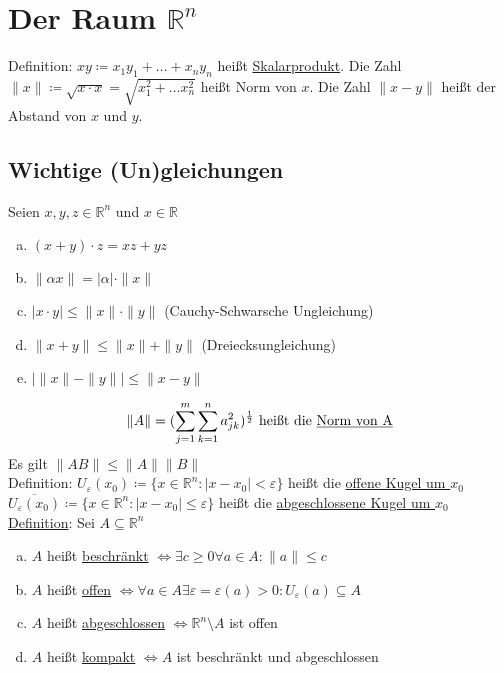 \section{Der Raum $\mathbb{R}^n$}
Definition: $xy \coloneqq x_1y_1 + \ldots + x_ny_n$ heißt \underline{Skalarprodukt}. Die Zahl $\| x \| \coloneqq \sqrt{x\cdot x} = \sqrt{x_1^2 + \ldots x_n^2}$
heißt Norm von $x$. Die Zahl $\| x-y\|$ heißt der Abstand von $x$ und $y$.

\subsection{Wichtige (Un)gleichungen}
Seien $x,y,z \in \mathbb{R}^n$ und $x \in \mathbb{R}$
\begin{enumerate} [a)]
    \item $(x+y) \cdot z = xz + yz$
    \item $\| \alpha x \| = |\alpha| \cdot \| x\|$
    \item $|x\cdot y| \leq \| x\| \cdot \| y\|$ (Cauchy-Schwarsche Ungleichung)
    \item $\|x+y\| \leq  \|x\| + \| y\|$ (Dreiecksungleichung)
    \item $|\| x \| - \| y \|| \leq \| x-y \|$
\end{enumerate}
\begin{align*}
    \|A\| = (\sum \limits_{j=1}^{m} \sum \limits_{k=1}^{n} a_{jk}^2)^{\frac{1}{2}} \text{ heißt die \underline{Norm von A}}
\end{align*}
Es gilt $\| AB\| \leq \| A \| \| B \|$ \\
Definition: $U_\varepsilon (x_0) \coloneqq \{x \in \mathbb{R}^n: |x-x_0| < \varepsilon \}$ heißt die \underline{offene Kugel um $x_0$} \\
$\overline{U_\varepsilon(x_0)} \coloneqq \{ x \in \mathbb{R}^n: |x-x_0| \leq \varepsilon\}$ heißt die \underline{abgeschlossene Kugel um $x_0$} \\

\underline{Definition}: Sei $A \subseteq \mathbb{R}^n$
\begin{enumerate} [a)]
    \item $A$ heißt \underline{beschränkt} $\Leftrightarrow \exists c \geq 0 \forall a \in A: \| a \| \leq c$
    \item $A$ heißt \underline{offen} $\Leftrightarrow \forall a \in A \exists \varepsilon = \varepsilon(a) > 0: U_\varepsilon(a) \subseteq A$ 
    \item $A$ heißt \underline{abgeschlossen} $\Leftrightarrow \mathbb{R}^n \setminus A$ ist offen
    \item $A$ heißt \underline{kompakt} $\Leftrightarrow A$ ist beschränkt und abgeschlossen 
\end{enumerate}